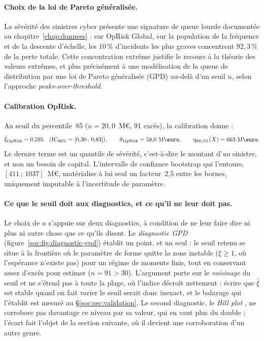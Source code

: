 
\paragraph{Choix de la loi de Pareto généralisée.} La sévérité des sinistres
cyber présente une signature de queue lourde documentée au chapitre~\ref{chap:donnees} : sur
OpRisk Global, sur la population de la fréquence et de la descente d'échelle, les $10\,\%$ d'incidents les plus
graves concentrent $92{,}3\,\%$
de la perte totale. Cette concentration extrême justifie le recours à la
théorie des valeurs extrêmes, et plus précisément à une modélisation de la
queue de distribution par une loi de Pareto généralisée (GPD) au-delà d'un
seuil $u$, selon l'approche \emph{peaks-over-threshold}.

\paragraph{Calibration OpRisk.} Au seuil du percentile~85
($u = 20{,}0$~M\euro, 91 excès), la calibration donne :
\begin{equation}
\hat{\xi}_{\text{OpRisk}} = 0{,}595 \quad (\text{IC}_{90\%}=[0{,}30\,;\,0{,}83]),
\qquad
\hat{\sigma}_{\text{OpRisk}} = 58{,}0~\text{M\euro},
\qquad
\qsev_{99{,}5\%}(X) = 663~\text{M\euro}.
\end{equation}
Le dernier terme est un quantile de sévérité, c'est-à-dire le montant d'\emph{un}
sinistre, et non un besoin de capital. L'intervalle de confiance bootstrap qui l'entoure,
$[411\,;\,1037]$~M\euro, matérialise à lui seul un facteur~2{,}5 entre les bornes, uniquement
imputable à l'incertitude de paramètre.

\paragraph{Ce que le seuil doit aux diagnostics, et ce qu'il ne leur doit pas.} Le choix de $u$
s'appuie sur deux diagnostics, à condition de ne leur faire dire ni plus ni autre chose que ce
qu'ils disent. Le \emph{diagnostic GPD} (figure~\ref{soc:fig:diagnostic-gpd}) établit un point,
et un seul : le seuil retenu se situe à la frontière où le paramètre de forme quitte la zone
instable ($\xi \geq 1$, où l'espérance n'existe pas) pour un régime de moments finis, tout en
conservant assez d'excès pour estimer ($n = 91 > 30$). L'argument porte sur le \emph{voisinage}
du seuil et ne s'étend pas à toute la plage, où l'indice décroît nettement : écrire que
$\hat\xi$ est stable quand on fait varier le seuil serait donc inexact, et le balayage qui
l'établit est mesuré au \S\ref{soc:sec:validation}. Le second diagnostic, le \emph{Hill plot}
\matcomp, ne corrobore pas davantage ce niveau par sa valeur, qui en vaut plus du double ;
l'écart fait l'objet de la section suivante, où il devient une corroboration d'un autre genre.


